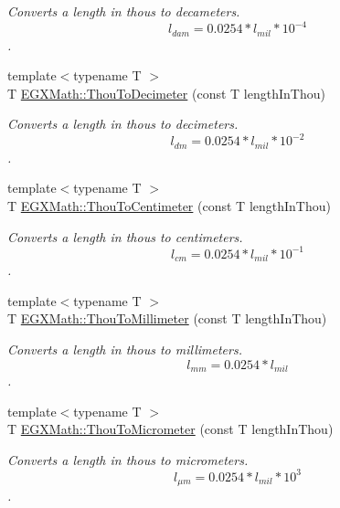 \begin{DoxyCompactItemize}
\begin{DoxyCompactList}\small\item\em Converts a length in thous to decameters. \[ l_{dam}=0.0254 * l_{mil} * 10^{-4} \]. \end{DoxyCompactList}\item 
{\footnotesize template$<$typename T $>$ }\\T \mbox{\hyperlink{group___e_g_x_math-_conversions-_length_conversions-_imperial-_thou-_s_i_ga9eb7f14e77defb2c5008314b9c92e6dd}{E\+G\+X\+Math\+::\+Thou\+To\+Decimeter}} (const T length\+In\+Thou)
\begin{DoxyCompactList}\small\item\em Converts a length in thous to decimeters. \[ l_{dm}=0.0254 * l_{mil} * 10^{-2} \]. \end{DoxyCompactList}\item 
{\footnotesize template$<$typename T $>$ }\\T \mbox{\hyperlink{group___e_g_x_math-_conversions-_length_conversions-_imperial-_thou-_s_i_ga8c02f5046eede6e801c206cbd02d1055}{E\+G\+X\+Math\+::\+Thou\+To\+Centimeter}} (const T length\+In\+Thou)
\begin{DoxyCompactList}\small\item\em Converts a length in thous to centimeters. \[ l_{cm}=0.0254 * l_{mil} * 10^{-1} \]. \end{DoxyCompactList}\item 
{\footnotesize template$<$typename T $>$ }\\T \mbox{\hyperlink{group___e_g_x_math-_conversions-_length_conversions-_imperial-_thou-_s_i_ga0fc7339abd95e8c5abaed9fee95bafbb}{E\+G\+X\+Math\+::\+Thou\+To\+Millimeter}} (const T length\+In\+Thou)
\begin{DoxyCompactList}\small\item\em Converts a length in thous to millimeters. \[ l_{mm}=0.0254 * l_{mil} \]. \end{DoxyCompactList}\item 
{\footnotesize template$<$typename T $>$ }\\T \mbox{\hyperlink{group___e_g_x_math-_conversions-_length_conversions-_imperial-_thou-_s_i_gaa3207ca1334f385f584132c109345a6d}{E\+G\+X\+Math\+::\+Thou\+To\+Micrometer}} (const T length\+In\+Thou)
\begin{DoxyCompactList}\small\item\em Converts a length in thous to micrometers. \[ l_{\mu m}=0.0254 * l_{mil} * 10^{3} \]. \end{DoxyCompactList}\item 

\end{DoxyCompactItemize}
